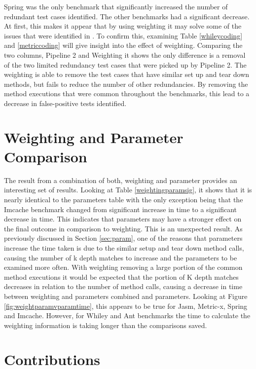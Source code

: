 Spring was the only benchmark that significantly increased the number of redundant test cases identified. The other benchmarks had a significant decrease. At first, this makes it appear that by using weighting it may solve some of the issues that were identified in \cite{koochakzadeh2009test} \cite{li2008static}. To confirm this, examining Table \ref{whileycoding} and \ref{metriccoding} will give insight into the effect of weighting. Comparing the two columns, Pipeline 2 and Weighting it shows the only difference is a removal of the two limited redundancy test cases that were picked up by Pipeline 2. The weighting is able to remove the test cases that have similar set up and tear down methods, but fails to reduce the number of other redundancies. By removing the method executions that were common throughout the benchmarks, this lead to a decrease in false-positive tests identified.


\section{Weighting and Parameter Comparison}
The result from a combination of both, weighting and parameter provides an interesting set of results. Looking at Table \ref{weightingparamsig}, it shows that it is nearly identical to the parameters table with the only exception being that the Imcache benchmark changed from significant increase in time to a significant decrease in time. This indicates that parameters may have a stronger effect on the final outcome in comparison to weighting. This is an unexpected result. As previously discussed in Section \ref{sec:param}, one of the reasons that parameters increase the time taken is due to the similar setup and tear down method calls, causing the number of k depth matches to increase and the parameters to be examined more often. With weighting removing a large portion of the common method executions it would be expected that the portion of K depth matches decreases in relation to the number of method calls, causing a decrease in time between weighting and parameters combined and parameters. Looking at Figure \ref{fig:weightparamvparamtime}, this appears to be true for Jasm, Metric-x, Spring and Imcache. However, for Whiley and Ant benchmarks the time to calculate the weighting information is taking longer than the comparisons saved. 

\section{Contributions}

